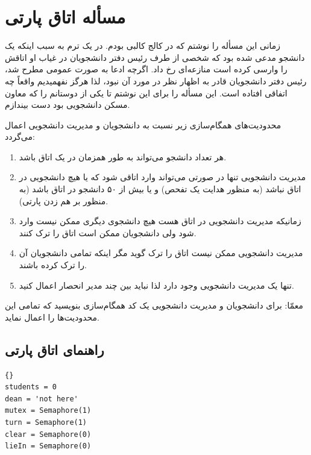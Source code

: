 \documentclass{book}
\newcommand{\clearemptydoublepage}{}%
\begin{document}

\newpage
\section{مسأله اتاق پارتی}

    زمانی این مسأله را نوشتم که در کالج کالبی بودم. در یک ترم  به سبب اینکه یک دانشجو مدعی شده بود که شخصی از طرف رئیس دفتر دانشجویان 
    در غیاب او اتاقش را وارسی کرده است منازعه‌ای رخ داد. اگرچه ادعا به صورت عمومی مطرح شد، رئیس دفتر دانشجویان قادر به اظهار نظر در مورد آن نبود، 
    لذا هرگز نفهمیدیم واقعاً چه اتفاقی افتاده است. این مسأله را برای این نوشتم تا یکی از دوستانم را که معاون مسکن دانشجویی بود دست بیندازم. 

    محدودیت‌های همگام‌سازی زیر نسبت به دانشجویان و مدیریت دانشجویی اعمال می‌گردد: 

\begin{enumerate}

\item
    هر تعداد دانشجو می‌تواند به طور همزمان در یک اتاق باشد.

\item 
    مدیریت دانشجویی تنها  در صورتی می‌تواند وارد اتاقی شود که یا هیچ دانشجویی در اتاق نباشد (به منظور هدایت یک تفحص) و 
    یا بیش از ۵۰ دانشجو در اتاق باشد  (به منظور بر هم زدن پارتی).

\item 
    زمانیکه مدیریت دانشجویی در اتاق هست هیچ دانشجوی دیگری ممکن نیست وارد شود ولی دانشجویان ممکن است اتاق را ترک کنند. 

\item 
    مدیریت دانشجویی ممکن نیست اتاق را ترک گوید مگر اینکه تمامی دانشجویان آن را ترک کرده باشند. 

\item 
    تنها یک مدیریت دانشجویی وجود دارد لذا نباید بین چند مدیر انحصار اعمال کنید. 

\end{enumerate}

    معمّا: برای دانشجویان و مدیریت دانشجویی یک کد همگام‌سازی بنویسید که تمامی این محدودیت‌ها را اعمال نماید. 


\clearemptydoublepage
\subsection{راهنمای اتاق پارتی}

\begin{latin}
\begin{lstlisting}[title=\rl{راهنمای اتاق پارتی}]{}
students = 0                
dean = 'not here'           
mutex = Semaphore(1)
turn = Semaphore(1)
clear = Semaphore(0)
lieIn = Semaphore(0)
\end{lstlisting}
\end{latin}
\end{document}
